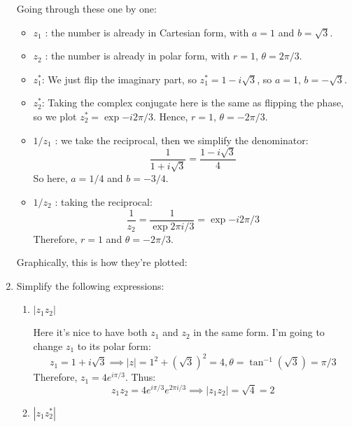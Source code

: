 \documentclass[10pt]{article}
\begin{document}
\begin{enumerate}[label=\alph*)]
			\begin{solution}
				Going through these one by one:
				\begin{itemize}
					\item \( z_1 \) : the number is already in Cartesian form, with \( a = 1 \) and 
						\( b = \sqrt{3}  \). 
					\item \( z_2 \) : the number is already in polar form, with \( r = 1 \), 
						\( \theta = 2 \pi /3 \). 
					\item \( z_1^* \): We just flip the imaginary part, so \( z_1^* = 1 - i\sqrt{3}  \), so 
						\( a = 1 \), \( b = -\sqrt{3}  \).
					\item \( z_2^* \): Taking the complex conjugate here is the same as flipping the phase, so we 
						plot \( z_2^* = \exp{-i 2 \pi /3} \). Hence, \( r = 1 \), \( \theta = -2 \pi /3 \). 
					\item \( 1 / z_1 \) : we take the reciprocal, then we simplify the denominator:
						\[
						\frac{1}{1 + i\sqrt{3} } = \frac{1 - i\sqrt{3} }{4}
						\] 
						So here, \( a = 1 / 4 \) and  \( b = - 3 / 4 \). 
					\item \( 1 / z_2 \) : taking the reciprocal:
						\[
							\frac{1}{z_2} = \frac{1}{\exp{2 \pi i / 3}} = \exp{- i 2\pi / 3}
						\] 
						Therefore, \( r = 1 \) and \( \theta = -2 \pi / 3 \). 
				\end{itemize}
				Graphically, this is how they're plotted:
				\begin{center}
				\end{center}
			\end{solution}
		\item Simplify the following expressions:
			\begin{enumerate}[label=\roman*)]
				\item \( |z_1z_2| \) 

					\begin{solution}
						Here it's nice to have both \( z_1  \) and \( z_2 \) in the same form. I'm going to 
							change \( z_1 \) to its polar form:
							\[
							z_1 = 1 + i\sqrt{3} \implies |z| = 1^2 + (\sqrt{3})^2 = 4, 
							\theta = \tan^{-1}(\sqrt{3}) = \pi / 3
							\] 
							Therefore, \( z_1 = 4e^{i \pi / 3} \). Thus:
							\[
							z_1z_2 = 4e^{i \pi / 3}e^{2 \pi i / 3} \implies |z_1z_2| = \sqrt{4} = 2
							\] 
					\end{solution}
				\item \( |z_1z_2^*| \) 


\end{enumerate}
\end{enumerate}
\end{document}
